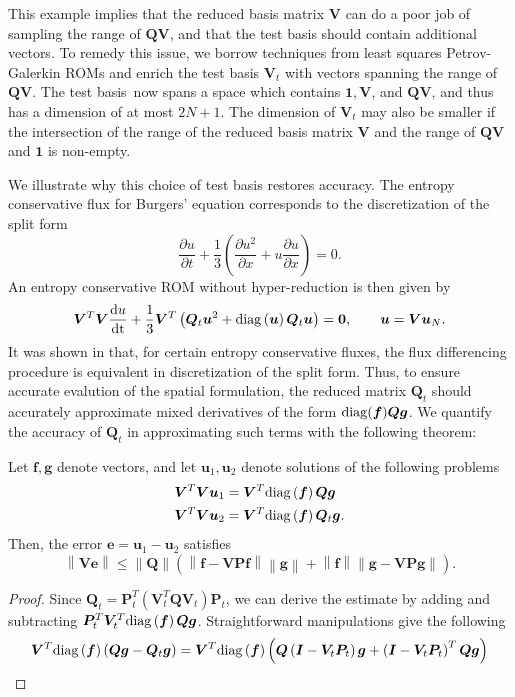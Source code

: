 \documentclass[review]{siamart171218}
\theoremstyle{assumption}
\newcommand{\diag}[1]{{\rm diag}\LRp{#1}}
\newcommand{\td}[2]{\frac{{\rm d}#1}{{\rm d}{\rm #2}}}
\newcommand{\pd}[2]{\frac{\partial#1}{\partial#2}}
\newcommand{\nor}[1]{\left\| #1 \right\|}
\newcommand{\LRp}[1]{\left( #1 \right)}
\newcommand{\note}[1]{{\color{blue}{#1}}}
\begin{document}
This example implies that the reduced basis matrix $\bm{V}$ can do a poor job of sampling the range of $\bm{Q}\bm{V}$, and that the test basis should contain additional vectors.  To remedy this issue, we borrow techniques from least squares Petrov-Galerkin ROMs \cite{carlberg2011efficient, carlberg2017galerkin} and enrich the test basis $\bm{V}_t$ with vectors spanning the range of $\bm{Q}\bm{V}$.  The test basis now spans a space which contains $\bm{1}, \bm{V}$, and $\bm{Q}\bm{V}$, and thus has a dimension of at most $2N+1$.  The dimension of $\bm{V}_t$ may also be smaller if the intersection of the range of the reduced basis matrix $\bm{V}$ and the range of $\bm{Q}\bm{V}$ and $\bm{1}$ is non-empty.  

We illustrate why this choice of test basis restores accuracy.  The entropy conservative flux for Burgers' equation corresponds to the discretization of the split form \cite{canuto2006spectral, chan2017discretely, maboudi2018conservative}
\[
\pd{u}{t} + \frac{1}{3}\LRp{\pd{u^2}{x}  + u\pd{u}{x}} = 0.
\]
An entropy conservative ROM without hyper-reduction is then given by 
\[
\bm{V}^T\bm{V}\td{u}{t} + \frac{1}{3}\bm{V}^T\LRp{\bm{Q}_t\bm{u}^2  + {\rm diag}\LRp{\bm{u}}\bm{Q}_t\bm{u}} = \bm{0}, \qquad \bm{u} = \bm{V}\bm{u}_N.
\]
It was shown in \cite{chan2017discretely, chenreview} that, for certain entropy conservative fluxes, the flux differencing procedure is equivalent in discretization of the split form.  Thus, to ensure accurate evalution of the spatial formulation, the reduced matrix $\bm{Q}_t$ should accurately approximate mixed derivatives of the form ${\rm diag}(\bm{f})\bm{Q}\bm{g}$.  We quantify the accuracy of $\bm{Q}_t$ in approximating such terms with the following theorem:
\begin{theorem}
Let $\bm{f},\bm{g}$ denote vectors, and let $\bm{u}_1, \bm{u}_2$ denote solutions of the following problems
\begin{align*}
\bm{V}^T\bm{V}\bm{u}_1 &= \bm{V}^T \diag{\bm{f}}\bm{Q}\bm{g}\\
\bm{V}^T\bm{V}\bm{u}_2 &= \bm{V}^T \diag{\bm{f}}\bm{Q}_t\bm{g}.
\end{align*}
Then, the error $\bm{e} = \bm{u}_1-\bm{u}_2$ satisfies
\[
\nor{\bm{V}\bm{e}} \leq \nor{\bm{Q}} \LRp{\nor{\bm{f}-\bm{V}\bm{P}\bm{f}} \nor{\bm{g}} + \nor{\bm{f}}\nor{\bm{g}-\bm{V}\bm{P}\bm{g}}}.
\]
\label{thm:acc}
\end{theorem}
\begin{proof}
Since $\bm{Q}_t = \bm{P}_t^T\LRp{\bm{V}_t^T\bm{Q}\bm{V}_t}\bm{P}_t$, we can derive the estimate by adding and subtracting $\bm{P}_t^T\bm{V}_t^T \diag{\bm{f}}\bm{Q}\bm{g}$.  Straightforward manipulations give the following
\begin{align*}
\bm{V}^T\diag{\bm{f}}\LRp{\bm{Q}\bm{g} - \bm{Q}_t\bm{g}} =  
\bm{V}^T\diag{\bm{f}} \LRp{\bm{Q}\LRp{\bm{I}-\bm{V}_t\bm{P}_t}\bm{g} + \LRp{\bm{I}-\bm{V}_t\bm{P}_t}^T\bm{Q}\bm{g}}
\end{align*}
 \note{Add proof}
 \end{proof}
\end{document}

